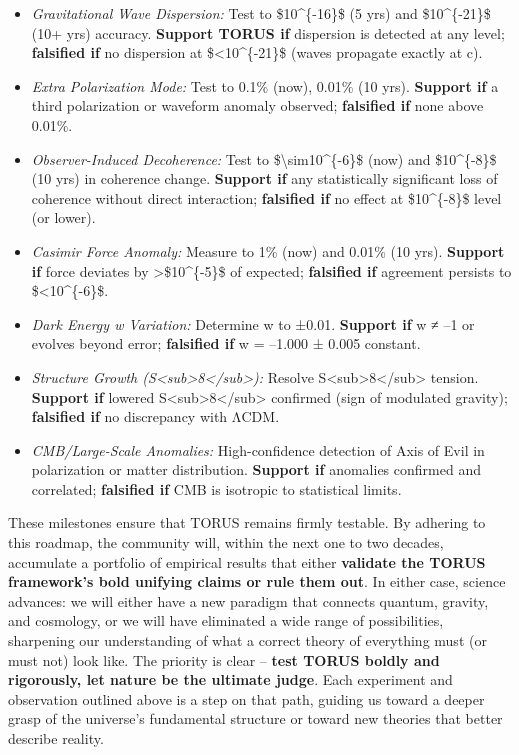 \documentclass[]{article}
\begin{document}
\begin{itemize}
\item
  \emph{Gravitational Wave Dispersion:} Test to \$10\^{}\{-16\}\$ (5
  yrs) and \$10\^{}\{-21\}\$ (10+ yrs) accuracy. \textbf{Support TORUS
  if} dispersion is detected at any level; \textbf{falsified if} no
  dispersion at \$\textless{}10\^{}\{-21\}\$ (waves propagate exactly at
  c)​.
\item
  \emph{Extra Polarization Mode:} Test to 0.1\% (now), 0.01\% (10 yrs).
  \textbf{Support if} a third polarization or waveform anomaly observed;
  \textbf{falsified if} none above 0.01\%​.
\item
  \emph{Observer-Induced Decoherence:} Test to
  \$\textbackslash{}sim10\^{}\{-6\}\$ (now) and \$10\^{}\{-8\}\$ (10
  yrs) in coherence change. \textbf{Support if} any statistically
  significant loss of coherence without direct interaction;
  \textbf{falsified if} no effect at \$10\^{}\{-8\}\$ level (or lower)​.
\item
  \emph{Casimir Force Anomaly:} Measure to 1\% (now) and 0.01\% (10
  yrs). \textbf{Support if} force deviates by
  \textgreater{}\$10\^{}\{-5\}\$ of expected​; \textbf{falsified if}
  agreement persists to \$\textless{}10\^{}\{-6\}\$.
\item
  \emph{Dark Energy w Variation:} Determine w to ±0.01. \textbf{Support
  if} w ≠ --1 or evolves beyond error; \textbf{falsified if} w = --1.000
  ± 0.005 constant​.
\item
  \emph{Structure Growth
  (S\textless{}sub\textgreater{}8\textless{}/sub\textgreater{}):}
  Resolve S\textless{}sub\textgreater{}8\textless{}/sub\textgreater{}
  tension. \textbf{Support if} lowered
  S\textless{}sub\textgreater{}8\textless{}/sub\textgreater{} confirmed
  (sign of modulated gravity)​; \textbf{falsified if} no discrepancy
  with ΛCDM.
\item
  \emph{CMB/Large-Scale Anomalies:} High-confidence detection of Axis of
  Evil in polarization or matter distribution. \textbf{Support if}
  anomalies confirmed and correlated​; \textbf{falsified if} CMB is
  isotropic to statistical limits​.
\end{itemize}

These milestones ensure that TORUS remains firmly testable. By adhering
to this roadmap, the community will, within the next one to two decades,
accumulate a portfolio of empirical results that either \textbf{validate
the TORUS framework's bold unifying claims or rule them out}. In either
case, science advances: we will either have a new paradigm that connects
quantum, gravity, and cosmology, or we will have eliminated a wide range
of possibilities, sharpening our understanding of what a correct theory
of everything must (or must not) look like. The priority is clear --
\textbf{test TORUS boldly and rigorously, let nature be the ultimate
judge}. Each experiment and observation outlined above is a step on that
path, guiding us toward a deeper grasp of the universe's fundamental
structure or toward new theories that better describe reality.
\end{document}
